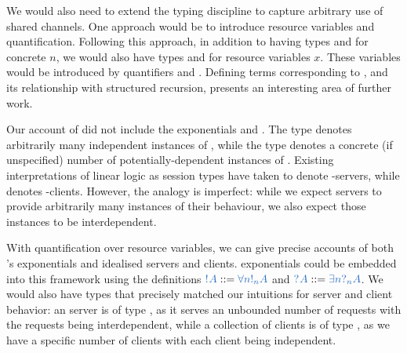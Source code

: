 \documentclass[UKenglish]{llncs}
\begin{document}
We would also need to extend the typing discipline to capture arbitrary use of shared channels.  One approach would be to introduce resource variables and quantification.  Following this approach, in addition to having types  and  for concrete $n$, we would also have types  and  for resource variables $x$.  These variables would be introduced by quantifiers  and . Defining terms corresponding to , and its relationship with structured recursion, presents an interesting area of further work.

Our account of \hcp did not include the exponentials  and . The type  denotes arbitrarily many independent instances of , while the type  denotes a concrete (if unspecified) number of potentially-dependent instances of .  Existing interpretations of linear logic as session types have taken  to denote -servers, while  denotes -clients.  However, the analogy is imperfect: while we expect servers to provide arbitrarily many instances of their behaviour, we also expect those instances to be interdependent.

With quantification over resource variables, we can give precise accounts of both \cp's exponentials and idealised servers and clients. \cp exponentials could be embedded into this framework using the definitions $\ty{\take{A}} ::= \ty{\forall{n}\take[n]{A}}$ and $\ty{\give{A}} ::= \ty{\exists{n}{\give[n]{A}}}$. We would also have types that precisely matched our intuitions for server and client behavior: an  server is of type , as it serves an unbounded number of requests with the requests being interdependent, while a collection of  clients is of type , as we have a specific number of clients with each client being independent.

\clearpage
\printbibliography
\end{document}

